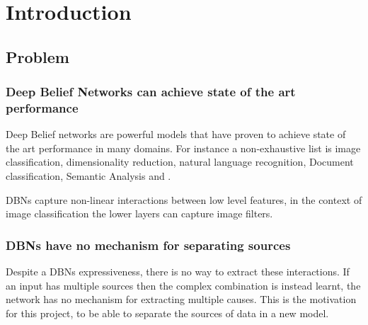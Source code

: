 \chapter{Introduction}

\section{Problem}
\subsection{Deep Belief Networks can achieve state of the art performance}
Deep Belief networks are powerful models that have proven to achieve state of the art performance in many domains. For instance a non-exhaustive list is image classification, dimensionality reduction, natural language recognition, Document classification, Semantic Analysis and .

DBNs capture non-linear interactions between low level features, in the context of image classification the lower layers can capture image filters.

\subsection{DBNs have no mechanism for separating sources}
Despite a DBNs expressiveness, there is no way to extract these interactions. If an input has multiple sources then the complex combination is instead learnt, the network has no mechanism for extracting multiple causes.
This is the motivation for this project, to be able to separate the sources of data in a new model.

 \cite{2015HistSciPy}

